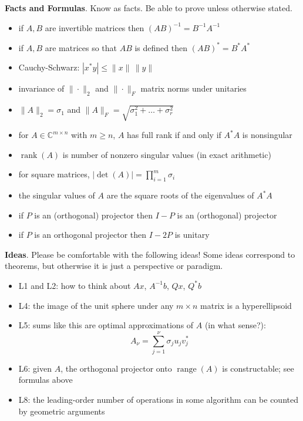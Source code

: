 \documentclass[11pt]{amsart}
\newcommand{\normalspacing}{\renewcommand{\baselinestretch}{1.1}\tiny\normalsize}
\newcommand{\bigspacing}{\renewcommand{\baselinestretch}{1.21}\tiny\normalsize}
\newcommand{\CC}{{\mathbb{C}}}
\newcommand{\rank}{\operatorname{rank}}
\newcommand{\range}{\operatorname{range}}
\begin{document}
\newpage\noindent \textbf{Facts and Formulas}.  Know as facts.  Be able to prove unless otherwise stated.
\begin{itemize}
\item if $A,B$ are invertible matrices then $(AB)^{-1} = B^{-1} A^{-1}$
\item if $A,B$ are matrices so that $AB$ is defined then $(AB)^* = B^* A^*$
\item Cauchy-Schwarz: $|x^* y| \le \|x\|\,\|y\|$ 
\item invariance of $\|\cdot\|_2$ and $\|\cdot\|_F$ matrix norms under unitaries
\item $\|A\|_2 = \sigma_1$ and $\|A\|_F = \sqrt{\sigma_1^2 + \dots + \sigma_r^2}$
\item for $A\in \CC^{m\times n}$ with $m\ge n$, $A$ has full rank if and only if $A^* A$ is nonsingular
\item $\rank(A)$ is number of nonzero singular values (in exact arithmetic)
\item for square matrices, $|\det(A)|=\prod_{i=1}^m \sigma_i$
\item the singular values of $A$ are the square roots of the eigenvalues of $A^*A$
\item if $P$ is an (orthogonal) projector then $I-P$ is an (orthogonal) projector
\item if $P$ is an orthogonal projector then $I-2P$ is unitary
\end{itemize}

\normalspacing

\bigskip\noindent \textbf{Ideas}.  Please be comfortable with the following ideas!  Some ideas correspond to theorems, but otherwise it is just a perspective or paradigm.

\bigspacing
\begin{itemize}
\item L1 and L2: how to think about $Ax$, $A^{-1}b$, $Qx$, $Q^* b$
\item L4: the image of the unit sphere under any $m\times n$ matrix is a hyperellipsoid
\item L5: sums like this are optimal approximations of $A$ (in what sense?):
	$$A_\nu = \sum_{j=1}^\nu \sigma_j u_j v_j^*$$
\item L6: given $A$, the orthogonal projector onto $\range(A)$ is constructable; see formulas above
\item L8: the leading-order number of operations in some algorithm can be counted by geometric arguments
\end{itemize}
\end{document}
